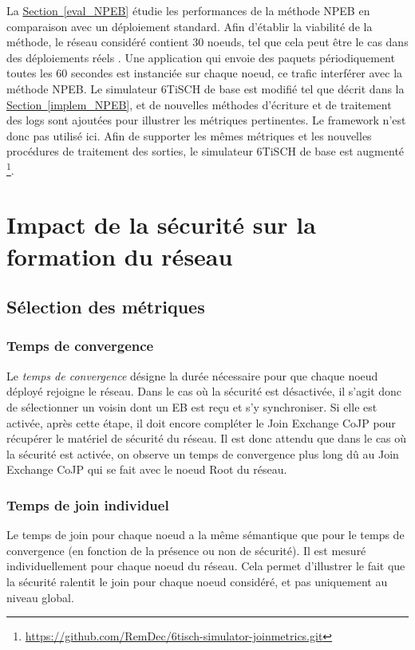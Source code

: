 \documentclass[]{report}
\newcommand{\wordlink}[2]{\hyperref[#2]{#1~\ref{#2}}}
\begin{document}
La \wordlink{Section}{eval_NPEB} étudie les performances de la méthode NPEB en comparaison avec un déploiement standard. Afin d'établir la viabilité de la méthode, le réseau considéré contient 30 noeuds, tel que cela peut être le cas dans des déploiements réels \cite{openbenchmark}. Une application qui envoie des paquets périodiquement toutes les 60 secondes est instanciée sur chaque noeud, ce trafic interférer avec la méthode NPEB. Le simulateur 6TiSCH de base est modifié tel que décrit dans la \wordlink{Section}{implem_NPEB}, et de nouvelles méthodes d'écriture et de traitement des logs sont ajoutées pour illustrer les métriques pertinentes. Le framework n'est donc pas utilisé ici. Afin de supporter les mêmes métriques et les nouvelles procédures de traitement des sorties, le simulateur 6TiSCH de base est augmenté \footnote{\url{https://github.com/RemDec/6tisch-simulator-joinmetrics.git}}.


\newpage

\section{Impact de la sécurité sur la formation du réseau}
\label{impact_secjoin}

\subsection{Sélection des métriques}

\subsubsection{Temps de convergence}

Le \textit{temps de convergence} désigne la durée nécessaire pour que chaque noeud déployé  rejoigne le réseau. Dans le cas où la sécurité est désactivée, il s'agit donc de sélectionner un voisin dont un EB est reçu et s'y synchroniser. Si elle est activée, après cette étape, il doit encore compléter le Join Exchange CoJP pour récupérer le matériel de sécurité du réseau. Il est donc attendu que dans le cas où la sécurité est activée, on observe un temps de convergence plus long dû au Join Exchange CoJP qui se fait avec le noeud Root du réseau.

\subsubsection{Temps de join individuel}

Le temps de join pour chaque noeud a la même sémantique que pour le temps de convergence (en fonction de la présence ou non de sécurité). Il est mesuré individuellement pour chaque noeud du réseau. Cela permet d'illustrer le fait que la sécurité ralentit le join pour chaque noeud considéré, et pas uniquement au niveau global.
\end{document}
